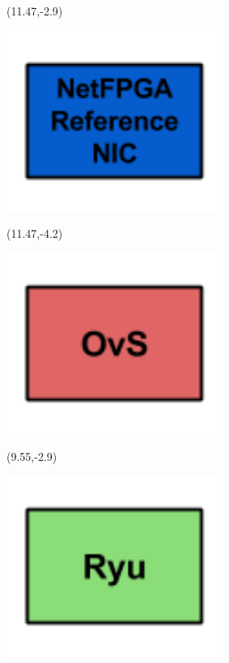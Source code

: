 \documentclass{beamer}
\begin{document}
\begin{frame}
\begin{textblock}{3}(11.47,-2.9)
\begin{minipage}{\textwidth}
\setlength{\parindent}{0pt}
\setlength{\parskip}{0.1cm}
\includegraphics[width=0.53\textwidth, right]{imagenes/buildingbnetfpga.png}
\end{minipage}
\end{textblock}

\begin{textblock}{3}(11.47,-4.2)
\begin{minipage}{\textwidth}
\setlength{\parindent}{0pt}
\setlength{\parskip}{0.1cm}
\includegraphics[width=0.53\textwidth, right]{imagenes/buildingblockovs.png}
\end{minipage}
\end{textblock}

\begin{textblock}{3}(9.55,-2.9)
\begin{minipage}{\textwidth}
\setlength{\parindent}{0pt}
\setlength{\parskip}{0.1cm}
\includegraphics[width=0.53\textwidth, right]{imagenes/buildingblockryu.png}
\end{minipage}
\end{textblock}


\end{frame}
\end{document}
